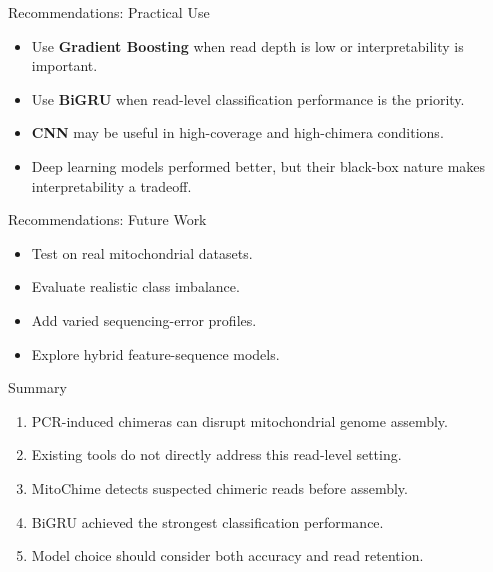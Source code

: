 \documentclass[aspectratio=169,11pt]{beamer}
\begin{document}
\begin{frame}{Recommendations: Practical Use}

\begin{itemize}
    \item Use \textbf{Gradient Boosting} when read depth is low or interpretability is important.
    \item Use \textbf{BiGRU} when read-level classification performance is the priority.
    \item \textbf{CNN} may be useful in high-coverage and high-chimera conditions.
    \item Deep learning models performed better, but their black-box nature makes interpretability a tradeoff.
\end{itemize}

\end{frame}

\begin{frame}{Recommendations: Future Work}

\begin{itemize}
    \item Test on real mitochondrial datasets.
    \item Evaluate realistic class imbalance.
    \item Add varied sequencing-error profiles.
    \item Explore hybrid feature-sequence models.
\end{itemize}

\end{frame}

\begin{frame}{Summary}

\large
\begin{enumerate}
    \item PCR-induced chimeras can disrupt mitochondrial genome assembly.
    \item Existing tools do not directly address this read-level setting.
    \item MitoChime detects suspected chimeric reads before assembly.
    \item BiGRU achieved the strongest classification performance.
    \item Model choice should consider both accuracy and read retention.
\end{enumerate}

\end{frame}
\end{document}
